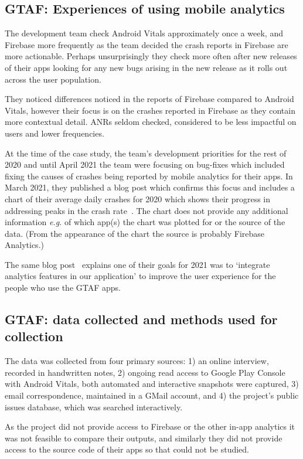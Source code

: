 \subsection{GTAF: Experiences of using mobile analytics}
The development team check Android Vitals approximately once a week, and Firebase more frequently as the team decided the crash reports in Firebase are more actionable. Perhaps unsurprisingly they check more often after new releases of their apps looking for any new bugs arising in the new release as it rolls out across the user population.

They noticed differences noticed in the reports of Firebase compared to Android Vitals, however their focus is on the crashes reported in Firebase as they contain more contextual detail. ANRs seldom checked, considered to be less impactful on users and lower frequencies. %

At the time of the case study, the team's development priorities for the rest of 2020 and until April 2021 the team were focusing on bug-fixes which included fixing the causes of crashes being reported by mobile analytics for their apps. In March 2021, they published a blog post which confirms this focus and includes a chart of their average daily crashes for 2020 which shows their progress in addressing peaks in the crash rate~\citep{gtafblog2021_gtaf_accomplishment_2020}. The chart does not provide any additional information \emph{e.g.} of which app(s) the chart was plotted for or the source of the data. (From the appearance of the chart the source is probably Firebase Analytics.)

The same blog post~\citep{gtafblog2021_gtaf_accomplishment_2020} explains one of their goals for 2021 was to `integrate analytics features in our application' to improve the user experience for the people who use the GTAF apps.

\subsection{GTAF: data collected and methods used for collection}
The data was collected from four primary sources: 1) an online interview, recorded in handwritten notes, 2) ongoing read access to Google Play Console with Android Vitals, both automated and interactive snapshots were captured, 3) email correspondence, maintained in a GMail account, and 4) the project's public issues database, which was searched interactively. 

As the project did not provide access to Firebase or the other in-app analytics it was not feasible to compare their outputs, and similarly they did not provide access to the source code of their apps so that could not be studied.


